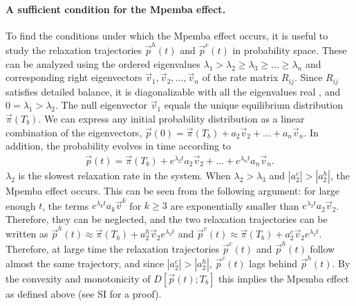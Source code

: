 \documentclass[a4paper,draft,aps,prl,preprint,superscriptaddress,nofootinbib]{revtex4}
\begin{document}
		\paragraph{A sufficient condition for the Mpemba effect.} 
		To find the conditions under which the Mpemba effect occurs, it is useful to study the relaxation trajectories $\vec p^h(t)$ and $\vec p^c (t)$ in probability space. These can be analyzed using the ordered eigenvalues $\lambda_1>\lambda_2\geq \lambda_3 \geq ... \geq \lambda_n$ and corresponding right eigenvectors $\vec v_1,\vec v_2,...,\vec v_n$ of the rate matrix $R_{ij}$. Since $R_{ij}$ satisfies detailed balance, it is diagonalizable with all the eigenvalues real \cite{schnakenberg1976network,kube2006coarse}, and $0=\lambda_1>\lambda_2$. The null eigenvector $\vec v_1$ equals the unique equilibrium distribution $\vec\pi( T_b)$. We can express any initial probability distribution as a linear combination of the eigenvectors, $\vec p (0) = \vec \pi( T_b) + a_2\vec v_2 +...+a_n \vec v_n$. In addition, the probability evolves in time according to 
		\begin{eqnarray}
		\vec p(t) = \vec\pi( T_b) + e^{\lambda_2 t}a_2 \vec v_2 +...+ e^{\lambda_n t}a_n \vec v_n .
		\end{eqnarray}
		$\lambda_2$  is the slowest relaxation rate in the system. When  $\lambda_2>\lambda_3$ and $\left|a_2^c\right|>\left|a_2^h\right|$,  the Mpemba effect occurs. This can be seen from the following argument: for large enough $t$,  the terms $e^{\lambda_k t}a_k \vec v^k$ for $k\geq 3$ are exponentially smaller than $e^{\lambda_2 t}a_2 \vec v_2$. Therefore, they can be neglected, and the two relaxation trajectories can be written as $\vec p^h(t) \approx \vec\pi(T_b) + a_2^h \vec{v}_2 e^{\lambda_2t}$ and $\vec p^c(t) \approx \vec\pi(T_b) + a_2^c \vec{v}_2 e^{\lambda_2t}$. Therefore, at large time the relaxation trajectories $\vec p^c(t)$ and $\vec p^h(t)$ follow almost the same trajectory, and since $|a_2^c|>|a_2^h|$,  $\vec p^c(t)$ lags behind $\vec p^h(t)$. By the convexity and monotonicity of $D[\vec p(t); T_b]$ this implies the Mpemba effect as defined above (see SI for a proof).   
		
\end{document}
